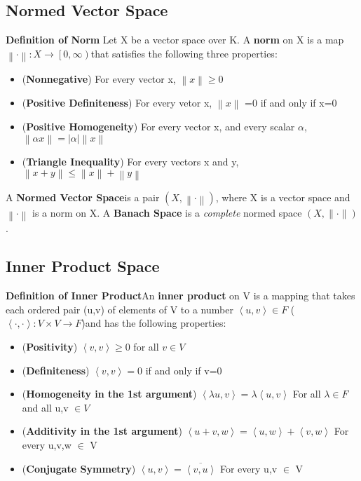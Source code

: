 \documentclass[UTF8]{article} %
\begin{document}
\subsection{Normed Vector Space}
\textbf{Definition of Norm} Let X be a vector space over K. A \textbf{norm} on X is a map$\left \| \cdot  \right \| : X \rightarrow \left [0,\infty  \right )$that satisfies the following three properties:\\
\begin{itemize}
    \item (\textbf{Nonnegative}) For every vector x, $\left \| x \right \| \geq 0$
    \item (\textbf{Positive Definiteness}) For every vetor x, $\left \| x \right \|$ =0 if and only if x=0
    \item (\textbf{Positive Homogeneity}) For every vector x, and every scalar $\alpha$, $\left \| \alpha x \right \| = \left |\alpha   \right | \left \|  x \right \|$
    \item (\textbf{Triangle Inequality}) For every vectors x and y, $\left \| x + y \right \| \leq \left \| x \right \| + \left \| y \right \|$

\end{itemize}
A \textbf{Normed Vector Space}is a pair $(X, \left \| \cdot  \right \|)$, where X is a vector space and $\left \| \cdot  \right \|$ is a norm on X.
A \textbf{Banach Space} is a \textit{complete} normed space $(X,\|\cdot \|)$.


\subsection{Inner Product Space}

\textbf{Definition of Inner Product}An \textbf{inner product} on V is a mapping that takes each ordered pair (u,v) of elements of V to a number $\left \langle u,v \right \rangle \in F$ ($\left \langle \cdot,\cdot \right \rangle : V \times V \rightarrow F$)and has the following properties:

\begin{itemize}
    \item (\textbf{Positivity}) $\left \langle v,v \right \rangle \geq 0$ for all $v\in V$
    \item (\textbf{Definiteness}) $\left \langle v,v \right \rangle = 0$ if and only if v=0
    \item (\textbf{Homogeneity in the 1st argument}) $\left \langle  \lambda  u,v \right \rangle =\lambda \left \langle u,v \right \rangle$ For all $\lambda \in F$ and all u,v $\in V$
    \item (\textbf{Additivity in the 1st argument}) $\left \langle   u+v,w\right \rangle = \left \langle u,w \right \rangle + \left \langle v,w \right \rangle$ For every u,v,w $\in$ V
    \item (\textbf{Conjugate Symmetry}) $\left \langle   u,v\right \rangle =  \overline{\left \langle v,u \right \rangle}$ For every u,v $\in$ V
\end{itemize}
\end{document}
